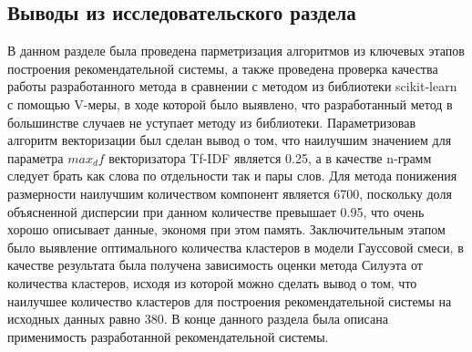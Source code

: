 \subsection{Выводы из исследовательского раздела}

В данном разделе была проведена парметризация алгоритмов из ключевых этапов построения рекомендательной системы, а также проведена проверка качества работы разработанного метода в сравнении с методом из библиотеки scikit-learn с помощью V-меры, в ходе которой было выявлено, что разработанный метод в большинстве случаев не уступает методу из библиотеки. Параметризовав алгоритм векторизации был сделан вывод о том, что наилучшим значением для параметра $max_df$ векторизатора Tf-IDF является 0.25, а в качестве n-грамм следует брать как слова по отдельности так и пары слов. Для метода понижения размерности наилучшим количеством компонент является 6700, поскольку доля объясненной дисперсии при данном количестве превышает 0.95, что очень хорошо описывает данные, экономя при этом память. Заключительным этапом было выявление оптимального количества кластеров в модели Гауссовой смеси, в качестве результата была получена зависимость оценки метода Силуэта от количества кластеров, исходя из которой можно сделать вывод о том, что наилучшее количество кластеров для построения рекомендательной системы на исходных данных равно 380. В конце данного раздела была описана применимость разработанной рекомендательной системы.

\pagebreak